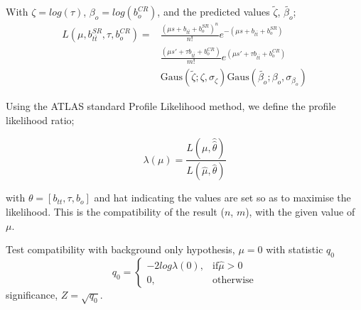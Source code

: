 \documentclass{beamer}
\begin{document}
\begin{frame}
With $\zeta = log\left(\tau\right)$, $\beta_{o} = log\left(b_{o}^{CR}\right)$, and the predicted values $\tilde{\zeta}$, $\tilde{\beta_{o}}$;
\begin{equation*}
\begin{split}
    L\left(\mu, b_{t\bar{t}}^{SR}, \tau, b_{o}^{CR}\right) = &\frac{\left(\mu s + b_{t\bar{t}} + b_{o}^{SR}\right)^n}{n!} e^{-\left(\mu s + b_{t\bar{t}} + b_{o}^{SR}\right)} \\
        &\frac{\left(\mu s' + \tau b_{t\bar{t}} + b_{o}^{CR}\right)}{m!} e^{\left(\mu s' + \tau b_{t\bar{t}} + b_{o}^{CR}\right)} \\
        &\text{Gaus}\left(\tilde{\zeta};\zeta, \sigma_{\zeta}\right)
        \text{Gaus}\left(\tilde{\beta_{o}};\beta_{o}, \sigma_{\beta_{o}}\right)
\end{split}
\end{equation*}
\end{frame}

\begin{frame}
Using the ATLAS standard Profile Likelihood method, we define the profile likelihood ratio;

\begin{equation*}
    \lambda\left(\mu\right) = \frac{L\left(\mu, \hat{\hat{\theta}}\right)}{L\left(\hat{\mu}, \hat{\theta}\right)}
\end{equation*}

with $\theta = \left[b_{tt}, \tau, b_{o}\right]$ and hat indicating the values are set so as to maximise the likelihood. This is the compatibility of the result ($n$, $m$), with the given value of $\mu$.

Test compatibility with background only hypothesis, $\mu = 0$ with statistic $q_{0}$
\begin{equation*}
    q_0 =
    \begin{cases}
        -2 log\lambda\left(0\right), & \text{if} \hat{\mu} > 0 \\
        0, & \text{otherwise}
    \end{cases}
\end{equation*}
significance, $Z = \sqrt{q_0}$.
\end{frame}
\end{document}

